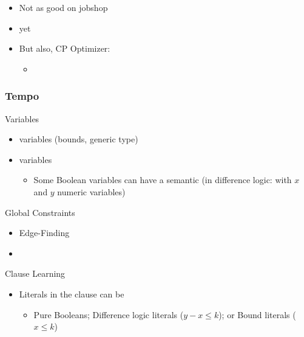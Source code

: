 \begin{frame}
\vfill

\begin{itemize}
  \item Not as good on jobshop

  \vfill\pause
  \item yet

  \vfill\pause
  \item But also, CP Optimizer:
  \vfill
  \begin{itemize}
    \item {}
  \end{itemize}
\end{itemize}

\vfill

\end{frame}


% 

\begin{frame}
\frametitle{Tempo}


\begin{myblock}{Variables}
\begin{itemize}
  \item {} variables (bounds, generic type)

  \vfill
  \item {} variables

  \vfill
  \begin{itemize}
     \item Some Boolean variables can have a semantic (in difference logic:  with $x$ and $y$ numeric variables)
   \end{itemize} 
\end{itemize}
\end{myblock}

\begin{myblock}{Global Constraints}
\begin{itemize}
  \item {Edge-Finding} 

  \vfill
  \item {} 
\end{itemize}
\end{myblock}

\begin{myblock}{Clause Learning}
\begin{itemize}
  \item Literals in the clause can be

  \vfill
  \begin{itemize}
    \item Pure Booleans; Difference logic literals ($y - x \leq k$); or Bound literals ($x \leq k$)
  \end{itemize}
\end{itemize}
\end{myblock}

\end{frame}
